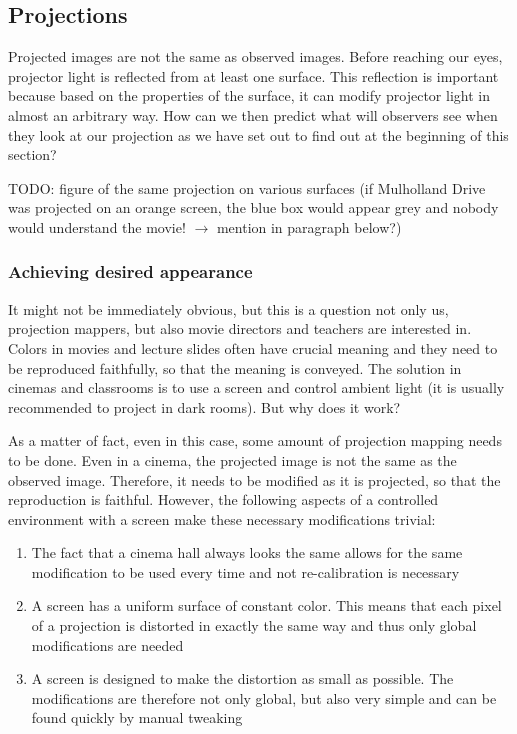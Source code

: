\subsection{Projections}
\label{section:background-projection_mapping-projections}

Projected images are not the same as observed images. Before reaching our eyes, projector light is reflected from at least one surface. This reflection is important because based on the properties of the surface, it can modify projector light in almost an arbitrary way. How can we then predict what will observers see when they look at our projection as we have set out to find out at the beginning of this section?

{\color{red} TODO: figure of the same projection on various surfaces (if Mulholland Drive was projected on an orange screen, the blue box would appear grey and nobody would understand the movie! \(\rightarrow \) mention in paragraph below?)}

\subsubsection{Achieving desired appearance}
\label{section:background-projection_mapping-projections-screen}

It might not be immediately obvious, but this is a question not only us, projection mappers, but also movie directors and teachers are interested in. Colors in movies and lecture slides often have crucial meaning and they need to be reproduced faithfully, so that the meaning is conveyed. The solution in cinemas and classrooms is to use a screen and control ambient light (it is usually recommended to project in dark rooms). But why does it work?

As a matter of fact, even in this case, some amount of projection mapping needs to be done. Even in a cinema, the projected image is not the same as the observed image. Therefore, it needs to be modified as it is projected, so that the reproduction is faithful. However, the following aspects of a controlled environment with a screen make these necessary modifications trivial:

 \begin{enumerate}
     \item The fact that a cinema hall always looks the same allows for the same modification to be used every time and not re-calibration is necessary
     \item A screen has a uniform surface of constant color. This means that each pixel of a projection is distorted in exactly the same way and thus only global modifications are needed
     \item A screen is designed to make the distortion as small as possible. The modifications are therefore not only global, but also very simple and can be found quickly by manual tweaking
 \end{enumerate}

